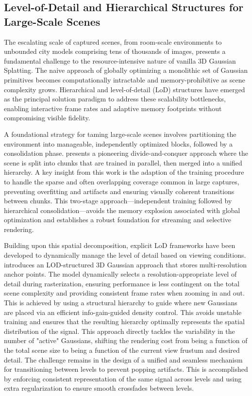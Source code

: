 \documentclass[11pt,a4paper]{article}
\begin{document}
\subsection{Level-of-Detail and Hierarchical Structures for Large-Scale Scenes}


The escalating scale of captured scenes, from room-scale environments to unbounded city models comprising tens of thousands of images, presents a fundamental challenge to the resource-intensive nature of vanilla 3D Gaussian Splatting. The naive approach of globally optimizing a monolithic set of Gaussian primitives becomes computationally intractable and memory-prohibitive as scene complexity grows. Hierarchical and level-of-detail (LoD) structures have emerged as the principal solution paradigm to address these scalability bottlenecks, enabling interactive frame rates and adaptive memory footprints without compromising visible fidelity.

A foundational strategy for taming large-scale scenes involves partitioning the environment into manageable, independently optimized blocks, followed by a consolidation phase. \cite{arxiv:2406.12080v1} presents a pioneering divide-and-conquer approach where the scene is split into chunks that are trained in parallel, then merged into a unified hierarchy. A key insight from this work is the adaption of the training procedure to handle the sparse and often overlapping coverage common in large captures, preventing overfitting and artifacts and ensuring visually coherent transitions between chunks. This two-stage approach---independent training followed by hierarchical consolidation---avoids the memory explosion associated with global optimization and establishes a robust foundation for streaming and selective rendering.

Building upon this spatial decomposition, explicit LoD frameworks have been developed to dynamically manage the level of detail based on viewing conditions. \cite{arxiv:2403.17898v1} introduces an LOD-structured 3D Gaussian approach that stores multi-resolution anchor points. The model dynamically selects a resolution-appropriate level of detail during rasterization, ensuring performance is less contingent on the total scene complexity and providing consistent frame rates when zooming in and out. This is achieved by using a structural hierarchy to guide where new Gaussians are placed via an efficient info-gain-guided density control. This avoids unstable training and ensures that the resulting hierarchy optimally represents the spatial distribution of the signal. This approach directly tackles the variability in the number of "active" Gaussians, shifting the rendering cost from being a function of the total scene size to being a function of the current view frustum and desired detail. The challenge remains in the design of a unified and seamless mechanism for transitioning between levels to prevent popping artifacts. This is accomplished by enforcing consistent representation of the same signal across levels and using extra regularization to ensure smooth crossfades between levels.
\end{document}
